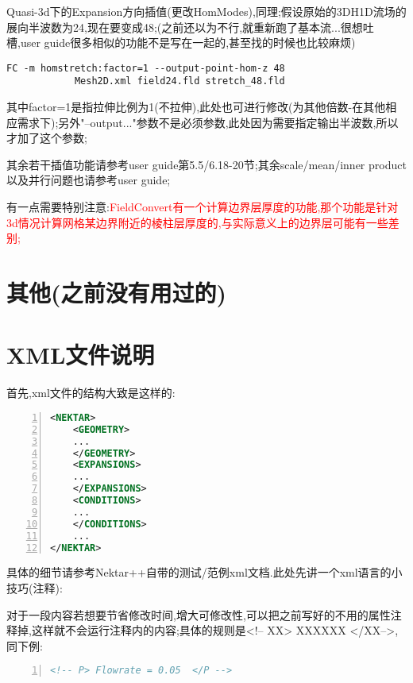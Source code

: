 Quasi-3d下的Expansion方向插值(更改HomModes),同理;假设原始的3DH1D流场的展向半波数为24,现在要变成48;(之前还以为不行,就重新跑了基本流...很想吐槽,user guide很多相似的功能不是写在一起的,甚至找的时候也比较麻烦)
\begin{lstlisting}[frame=single]
FC -m homstretch:factor=1 --output-point-hom-z 48 
			Mesh2D.xml field24.fld stretch_48.fld
\end{lstlisting}
\par
其中factor=1是指拉伸比例为1(不拉伸),此处也可进行修改(为其他倍数-在其他相应需求下);另外"--output..."参数不是必须参数,此处因为需要指定输出半波数,所以才加了这个参数;

其余若干插值功能请参考user guide第5.5/6.18-20节;其余scale/mean/inner product以及并行问题也请参考user guide;\par
有一点需要特别注意:\textcolor{red}{FieldConvert有一个计算边界层厚度的功能,那个功能是针对3d情况计算网格某边界附近的棱柱层厚度的,与实际意义上的边界层可能有一些差别;}



\section{其他(之前没有用过的)}





















\section{XML文件说明}
首先,xml文件的结构大致是这样的:
\begin{lstlisting}[frame=single,numbers=left,language=XML]
<NEKTAR>
	<GEOMETRY>
	...
	</GEOMETRY>
	<EXPANSIONS>
	...
	</EXPANSIONS>
	<CONDITIONS>
	...
	</CONDITIONS>
	...
</NEKTAR>
\end{lstlisting}
\par
具体的细节请参考Nektar++自带的测试/范例xml文档.此处先讲一个xml语言的小技巧(注释):\par
对于一段内容若想要节省修改时间,增大可修改性,可以把之前写好的不用的属性注释掉,这样就不会运行注释内的内容;具体的规则是<!-- XX>  XXXXXX </XX-->,同下例:\par
\begin{lstlisting}[frame=single,numbers=left,language=XML]
<!-- P> Flowrate = 0.05  </P -->
\end{lstlisting}
\par

